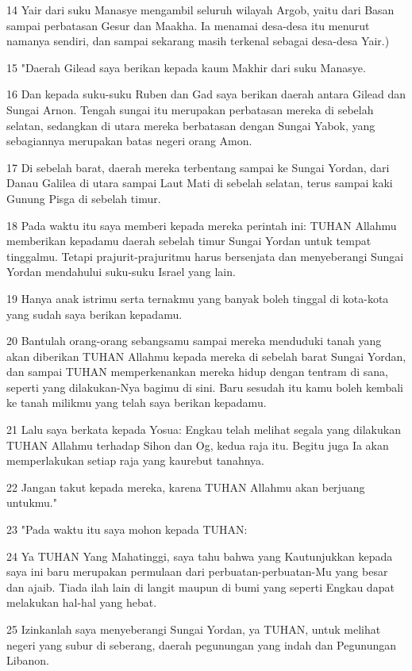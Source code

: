 \par 14 Yair dari suku Manasye mengambil seluruh wilayah Argob, yaitu dari Basan sampai perbatasan Gesur dan Maakha. Ia menamai desa-desa itu menurut namanya sendiri, dan sampai sekarang masih terkenal sebagai desa-desa Yair.)
\par 15 "Daerah Gilead saya berikan kepada kaum Makhir dari suku Manasye.
\par 16 Dan kepada suku-suku Ruben dan Gad saya berikan daerah antara Gilead dan Sungai Arnon. Tengah sungai itu merupakan perbatasan mereka di sebelah selatan, sedangkan di utara mereka berbatasan dengan Sungai Yabok, yang sebagiannya merupakan batas negeri orang Amon.
\par 17 Di sebelah barat, daerah mereka terbentang sampai ke Sungai Yordan, dari Danau Galilea di utara sampai Laut Mati di sebelah selatan, terus sampai kaki Gunung Pisga di sebelah timur.
\par 18 Pada waktu itu saya memberi kepada mereka perintah ini: TUHAN Allahmu memberikan kepadamu daerah sebelah timur Sungai Yordan untuk tempat tinggalmu. Tetapi prajurit-prajuritmu harus bersenjata dan menyeberangi Sungai Yordan mendahului suku-suku Israel yang lain.
\par 19 Hanya anak istrimu serta ternakmu yang banyak boleh tinggal di kota-kota yang sudah saya berikan kepadamu.
\par 20 Bantulah orang-orang sebangsamu sampai mereka menduduki tanah yang akan diberikan TUHAN Allahmu kepada mereka di sebelah barat Sungai Yordan, dan sampai TUHAN memperkenankan mereka hidup dengan tentram di sana, seperti yang dilakukan-Nya bagimu di sini. Baru sesudah itu kamu boleh kembali ke tanah milikmu yang telah saya berikan kepadamu.
\par 21 Lalu saya berkata kepada Yosua: Engkau telah melihat segala yang dilakukan TUHAN Allahmu terhadap Sihon dan Og, kedua raja itu. Begitu juga Ia akan memperlakukan setiap raja yang kaurebut tanahnya.
\par 22 Jangan takut kepada mereka, karena TUHAN Allahmu akan berjuang untukmu."
\par 23 "Pada waktu itu saya mohon kepada TUHAN:
\par 24 Ya TUHAN Yang Mahatinggi, saya tahu bahwa yang Kautunjukkan kepada saya ini baru merupakan permulaan dari perbuatan-perbuatan-Mu yang besar dan ajaib. Tiada ilah lain di langit maupun di bumi yang seperti Engkau dapat melakukan hal-hal yang hebat.
\par 25 Izinkanlah saya menyeberangi Sungai Yordan, ya TUHAN, untuk melihat negeri yang subur di seberang, daerah pegunungan yang indah dan Pegunungan Libanon.
